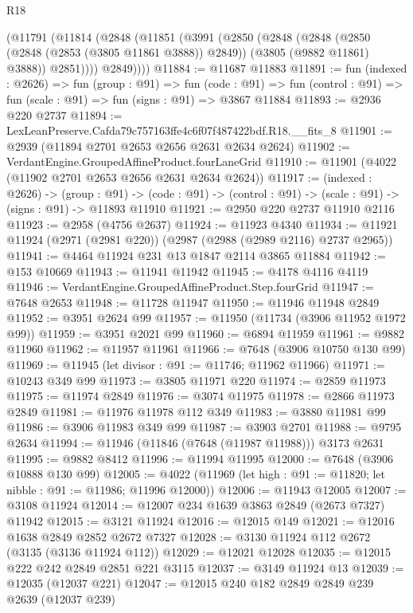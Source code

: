 \begin{lexlean}{R18}
\begin{coremodule}
      (@11791
        (@11814
          (@2848
            (@11851
              (@3991
                (@2850
                  (@2848
                    (@2848
                      (@2850 (@2848 (@2853 (@3805 @11861 @3888)) @2849))
                      (@3805 (@9882 @11861) @3888))
                    @2851))))
            @2849))))
@11884 := @11687 @11883
@11891 := fun (indexed : @2626) =>
  fun (group : @91) =>
  fun (code : @91) => fun (control : @91) => fun (scale : @91) => fun (signs : @91) => @3867 @11884
@11893 := @2936 @220 @2737
@11894 := LexLeanPreserve.Cafda79c757163ffe4c6f07f487422bdf.R18.__fits_8
@11901 := @2939 (@11894 @2701 @2653 @2656 @2631 @2634 @2624)
@11902 := VerdantEngine.GroupedAffineProduct.fourLaneGrid
@11910 := @11901 (@4022 (@11902 @2701 @2653 @2656 @2631 @2634 @2624))
@11917 := (indexed : @2626) ->
  (group : @91) ->
  (code : @91) -> (control : @91) -> (scale : @91) -> (signs : @91) -> @11893 @11910
@11921 := @2950 @220 @2737 @11910 @2116
@11923 := @2958 (@4756 @2637)
@11924 := @11923 @4340
@11934 := @11921 @11924 (@2971 (@2981 @220)) (@2987 (@2988 (@2989 @2116) @2737 @2965))
@11941 := @4464 @11924 @231 @13 @1847 @2114 @3865 @11884
@11942 := @153 @10669
@11943 := @11941 @11942
@11945 := @4178 @4116 @4119
@11946 := VerdantEngine.GroupedAffineProduct.Step.fourGrid
@11947 := @7648 @2653
@11948 := @11728 @11947
@11950 := @11946 @11948 @2849
@11952 := @3951 @2624 @99
@11957 := @11950 (@11734 (@3906 @11952 @1972 @99))
@11959 := @3951 @2021 @99
@11960 := @6894 @11959
@11961 := @9882 @11960
@11962 := @11957 @11961
@11966 := @7648 (@3906 @10750 @130 @99)
@11969 := @11945 (let divisor : @91 := @11746; @11962 @11966)
@11971 := @10243 @349 @99
@11973 := @3805 @11971 @220
@11974 := @2859 @11973
@11975 := @11974 @2849
@11976 := @3074 @11975
@11978 := @2866 @11973 @2849
@11981 := @11976 @11978 @112 @349
@11983 := @3880 @11981 @99
@11986 := @3906 @11983 @349 @99
@11987 := @3903 @2701
@11988 := @9795 @2634
@11994 := @11946 (@11846 (@7648 (@11987 @11988))) @3173 @2631
@11995 := @9882 @8412
@11996 := @11994 @11995
@12000 := @7648 (@3906 @10888 @130 @99)
@12005 := @4022 (@11969 (let high : @91 := @11820; let nibble : @91 := @11986; @11996 @12000))
@12006 := @11943 @12005
@12007 := @3108 @11924
@12014 := @12007 @234 @1639 @3863 @2849 (@2673 @7327) @11942
@12015 := @3121 @11924
@12016 := @12015 @149
@12021 := @12016 @1638 @2849 @2852 @2672 @7327
@12028 := @3130 @11924 @112 @2672 (@3135 (@3136 @11924 @112))
@12029 := @12021 @12028
@12035 := @12015 @222 @242 @2849 @2851 @221 @3115
@12037 := @3149 @11924 @13
@12039 := @12035 (@12037 @221)
@12047 := @12015 @240 @182 @2849 @2849 @239 @2639 (@12037 @239)

\end{coremodule}
\end{lexlean}
